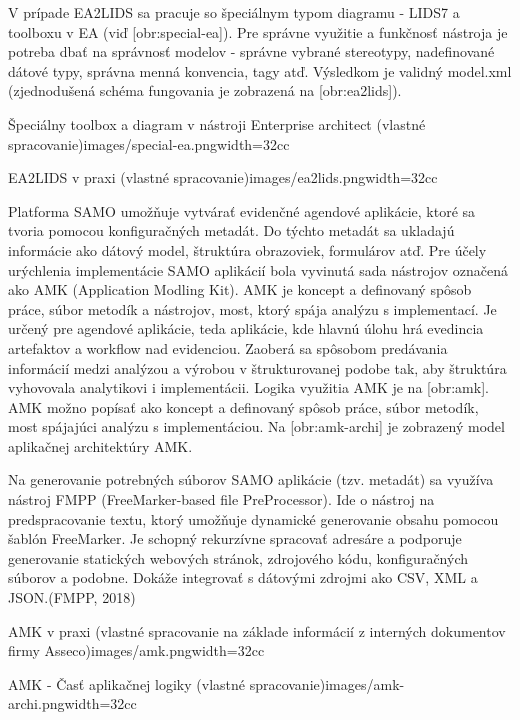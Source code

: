 V prípade EA2LIDS sa pracuje so špeciálnym typom diagramu - LIDS7 a toolboxu v EA (viď [obr:special-ea]). Pre správne využitie a funkčnosť nástroja je potreba dbať na správnosť modelov - správne vybrané stereotypy, nadefinované dátové typy, správna menná konvencia, tagy atď. Výsledkom je validný model.xml (zjednodušená schéma fungovania je zobrazená na [obr:ea2lids]).

{Špeciálny toolbox a diagram v nástroji Enterprise architect (vlastné spracovanie)}{images/special-ea.png}{width=32cc}

{EA2LIDS v praxi (vlastné spracovanie)}{images/ea2lids.png}{width=32cc}

Platforma SAMO umožňuje vytvárať evidenčné agendové aplikácie, ktoré sa tvoria pomocou konfiguračných metadát. Do týchto metadát sa ukladajú informácie ako dátový model, štruktúra obrazoviek, formulárov atď. Pre účely urýchlenia implementácie SAMO aplikácií bola vyvinutá sada nástrojov označená ako AMK (Application Modling Kit). AMK je koncept a definovaný spôsob práce, súbor metodík a nástrojov, most, ktorý spája analýzu s implementací. Je určený pre agendové aplikácie, teda aplikácie, kde hlavnú úlohu hrá evedincia artefaktov a workflow nad evidenciou. Zaoberá sa spôsobom predávania informácií medzi analýzou a výrobou v štrukturovanej podobe tak, aby štruktúra vyhovovala analytikovi i implementácii. Logika využitia AMK je na [obr:amk]. AMK možno popísať ako koncept a definovaný spôsob práce, súbor metodík, most spájajúci analýzu s implementáciou. Na [obr:amk-archi] je zobrazený model aplikačnej architektúry AMK.

Na generovanie potrebných súborov SAMO aplikácie (tzv. metadát) sa využíva nástroj FMPP (FreeMarker-based file PreProcessor). Ide o nástroj na predspracovanie textu, ktorý umožňuje dynamické generovanie obsahu pomocou šablón FreeMarker. Je schopný rekurzívne spracovať adresáre a podporuje generovanie statických webových stránok, zdrojového kódu, konfiguračných súborov a podobne. Dokáže integrovať s dátovými zdrojmi ako CSV, XML a JSON.\scr (FMPP, 2018)

{AMK v praxi (vlastné spracovanie na základe informácií z interných dokumentov firmy Asseco)}{images/amk.png}{width=32cc}

{AMK - Časť aplikačnej logiky (vlastné spracovanie)}{images/amk-archi.png}{width=32cc}
%


